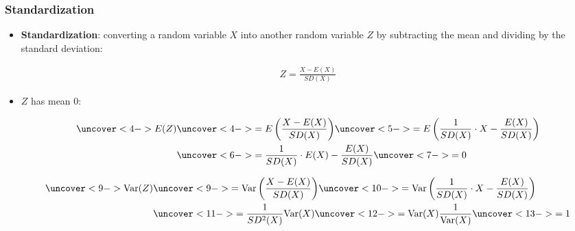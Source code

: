 \documentclass[handout]{beamer}\usepackage[]{graphicx}\usepackage[]{color}
\numberwithin{equation}{section}
\begin{document}
\begin{frame}
\frametitle{Standardization} \scriptsize
\begin{itemize}
\item {\bf Standardization}: converting a random variable $X$ into another random variable $Z$ by subtracting the mean and dividing by the standard deviation:

\pause \begin{align*}
Z = \frac{X - E(X)}{SD(X)}
\end{align*}
\pause \item $Z$ has mean 0:

\begin{align*}
\uncover<4->{E(Z)} & \uncover<4->{= E \left (\frac{X - E(X)}{SD(X)} \right)} \uncover<5->{ = E \left (\frac{1}{SD(X)} \cdot X - \frac{E(X)}{SD(X)} \right )} \\
&\uncover<6->{= \frac{1}{SD(X)} \cdot E(X) - \frac{E(X)}{SD(X)}} \uncover<7->{ = 0} \\
\end{align*}

\begin{align*}
\uncover<9->{\text{Var}(Z)} & \uncover<9->{= \text{Var} \left (\frac{X - E(X)}{SD(X)} \right)} \uncover<10->{ = \text{Var} \left (\frac{1}{SD(X)} \cdot X - \frac{E(X)}{SD(X)} \right)} \\
&\uncover<11->{= \frac{1}{SD^2(X)} \text{Var}(X)}  \uncover<12->{= \text{Var}(X) \frac{1}{\text{Var}(X)}} \uncover<13->{ = 1} \\
\end{align*}

\end{itemize}

\end{frame}
\end{document}
